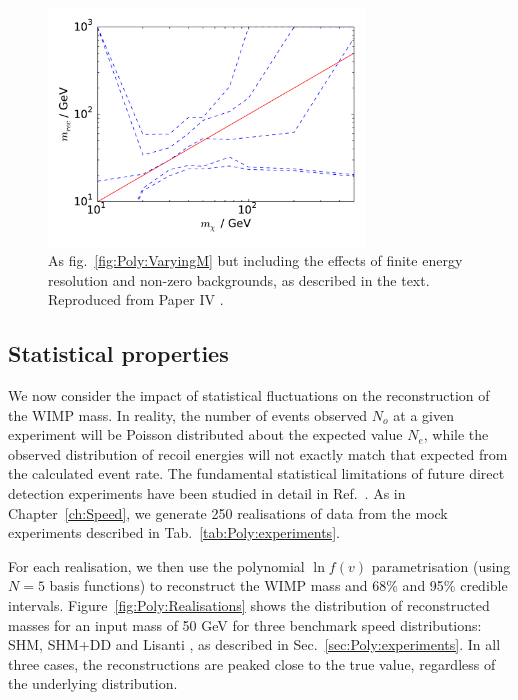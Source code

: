 \begin{figure}[t]
\centering
  \includegraphics[width=0.75\textwidth]{Poly/VaryingM_real.pdf}
  \caption[Reconstructed WIMP mass as a function of input WIMP mass for experiments including the effects of finite backgrounds and energy resolution]{As fig.~\ref{fig:Poly:VaryingM} but including the effects of finite energy resolution and non-zero backgrounds, as described in the text. Reproduced from Paper IV \cite{Kavanagh:2014}.}
  \label{fig:Poly:VaryingM_real}
\end{figure}

\subsection{Statistical properties}
\label{sec:Poly:stats}


We now consider the impact of statistical fluctuations on the reconstruction of the WIMP mass. In reality, the number of events observed $N_o$ at a given experiment will be Poisson distributed about the expected value $N_e$, while the observed distribution of recoil energies will not exactly match that expected from the calculated event rate. The fundamental statistical limitations of future direct detection experiments have been studied in detail in Ref.~\cite{Strege:2012}. As in Chapter~\ref{ch:Speed}, we generate 250 realisations of data from the mock experiments described in Tab.~\ref{tab:Poly:experiments}.

For each realisation, we then use the polynomial $\ln f(v)$ parametrisation (using $N = 5$ basis functions) to reconstruct the WIMP mass and 68\% and 95\% credible intervals. Figure~\ref{fig:Poly:Realisations} shows the distribution of reconstructed masses for an input mass of 50 GeV for three benchmark speed distributions: SHM, SHM+DD and Lisanti \etal, as described in Sec.~\ref{sec:Poly:experiments}. In all three cases, the reconstructions are peaked close to the true value, regardless of the underlying distribution.

